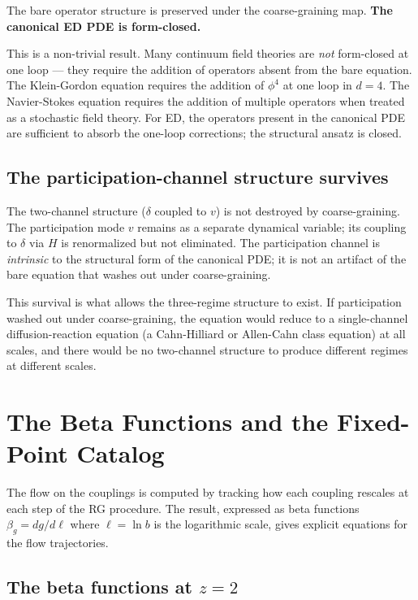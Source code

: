 \documentclass[11pt,a4paper]{article}
\begin{document}
The bare operator structure is preserved under the coarse-graining map. \textbf{The canonical ED PDE is form-closed.}

This is a non-trivial result. Many continuum field theories are \emph{not} form-closed at one loop --- they require the addition of operators absent from the bare equation. The Klein-Gordon equation requires the addition of $\phi^4$ at one loop in $d = 4$. The Navier-Stokes equation requires the addition of multiple operators when treated as a stochastic field theory. For ED, the operators present in the canonical PDE are sufficient to absorb the one-loop corrections; the structural ansatz is closed.

\subsection{The participation-channel structure survives}

The two-channel structure ($\delta$ coupled to $v$) is not destroyed by coarse-graining. The participation mode $v$ remains as a separate dynamical variable; its coupling to $\delta$ via $H$ is renormalized but not eliminated. The participation channel is \emph{intrinsic} to the structural form of the canonical PDE; it is not an artifact of the bare equation that washes out under coarse-graining.

This survival is what allows the three-regime structure to exist. If participation washed out under coarse-graining, the equation would reduce to a single-channel diffusion-reaction equation (a Cahn-Hilliard or Allen-Cahn class equation) at all scales, and there would be no two-channel structure to produce different regimes at different scales.

\section{The Beta Functions and the Fixed-Point Catalog}

The flow on the couplings is computed by tracking how each coupling rescales at each step of the RG procedure. The result, expressed as beta functions $\beta_g = dg/d\ell$ where $\ell = \ln b$ is the logarithmic scale, gives explicit equations for the flow trajectories.

\subsection{The beta functions at $z = 2$}
\end{document}
